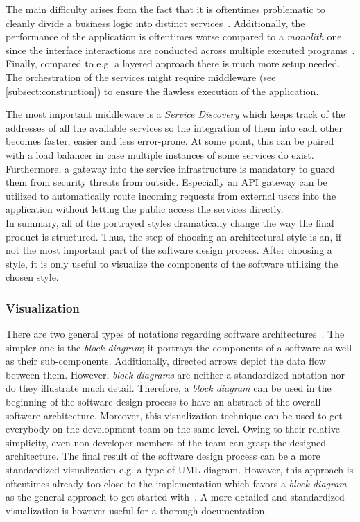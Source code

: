 \documentclass[12pt,a4paper,twoside]{report}
\begin{document}
The main difficulty arises from the fact that it is oftentimes problematic to cleanly
divide a business logic into distinct services~\cite{fowler-monolith-first}.
Additionally, the performance of the application is oftentimes worse compared to
a \textit{monolith} one since the interface interactions are conducted across multiple
executed programs~\cite{richards-sa-patterns}.
Finally, compared to e.g. a layered approach there is much more setup needed.
The orchestration of the services might require middleware (see \ref{subsect:construction})
to ensure the flawless execution of the application.

The most important middleware is a \textit{Service Discovery} which keeps track
of the addresses of all the available services so the integration of them into
each other becomes faster, easier and less error-prone.
At some point, this can be paired with a load balancer in case
multiple instances of some services do exist.
Furthermore, a gateway into the service infrastructure is mandatory to guard
them from security threats from outside. Especially an API gateway can be
utilized to automatically route incoming requests from external users into the
application without letting the public access the services directly.\\

In summary, all of the portrayed styles dramatically change the way the final product
is structured. Thus, the step of choosing an architectural style is an, if not the
most important part of the software design process. After choosing a style,
it is only useful to visualize the components of the software utilizing the chosen style.


\subsubsection{Visualization}

There are two general types of notations regarding software architectures~\cite{sommerville-se}.
The simpler one is the \textit{block diagram}; it portrays the components of
a software as well as their sub-components. Additionally, directed arrows depict
the data flow between them. However, \textit{block diagrams} are neither a
standardized notation nor do they illustrate much detail.
Therefore, a \textit{block diagram} can be used in the beginning of the software
design process to have an abstract of the overall software architecture.
Moreover, this visualization technique can be used to get everybody on the development team
on the same level. Owing to their relative simplicity, even non-developer members
of the team can grasp the designed architecture. The final result of
the software design process can be a more standardized visualization
e.g. a type of UML diagram. However, this approach is oftentimes already too close
to the implementation which favors a \textit{block diagram} as the general
approach to get started with~\cite{sommerville-se}. A more detailed and standardized
visualization is however useful for a thorough documentation.
\end{document}
